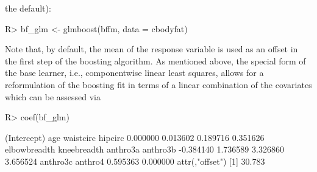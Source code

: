 \documentclass{article}
\newenvironment{Schunk}{}{}
\begin{document}
the default): 
\begin{Schunk}
\begin{Sinput}
R> bf_glm <- glmboost(bffm, data = cbodyfat)
\end{Sinput}
\end{Schunk}
Note that, by default, the mean of the response variable is used as an
offset in the  
first step of the boosting algorithm.
As mentioned above, the special form of the base learner,
i.e., componentwise linear least squares, 
allows for a reformulation of the boosting fit in terms of a linear combination
of the covariates which can be assessed via
\begin{Schunk}
\begin{Sinput}
R> coef(bf_glm)
\end{Sinput}
\begin{Soutput}
 (Intercept)          age    waistcirc      hipcirc 
    0.000000     0.013602     0.189716     0.351626 
elbowbreadth  kneebreadth     anthro3a     anthro3b 
   -0.384140     1.736589     3.326860     3.656524 
    anthro3c      anthro4 
    0.595363     0.000000 
attr(,"offset")
[1] 30.783
\end{Soutput}
\end{Schunk}
\end{document}
